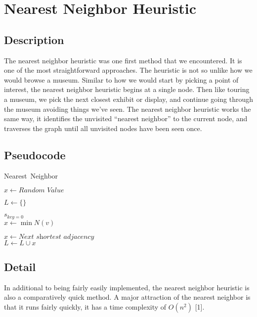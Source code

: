 \documentclass{article}
\begin{document}
\section{Nearest Neighbor Heuristic}

\subsection{Description}

The nearest neighbor heuristic was one first method that we encountered. It is
one of the most straightforward approaches. The heuristic is not so unlike how
we would browse a museum. Similar to how we would start by picking a point of
interest, the nearest neighbor heuristic begins at a single node. Then like
touring a museum, we pick the next closest exhibit or display, and continue
going through the museum avoiding things we’ve seen. The nearest neighbor
heuristic works the same way, it identifies the unvisited “nearest neighbor” to
the current node, and traverses the graph until all unvisited nodes have been
seen once.

\subsection{Pseudocode}

\begin{algorithm}
  \caption{Nearest\ Neighbor}
  \label{alg1}
  \begin{algorithmic}[1]

    \State $x \gets \textit{Random\ Value}$

    \State $L \gets \{\}$

    \State $s_{\textit{key} = 0}$
    \\
        \State $x \gets \min N(v)$

        \Else
          \State $x \gets \textit{Next shortest adjacency}$
        \EndIf
      \EndFor
    \EndWhile
    \\
    \State $L \gets L \cup {x}$
    \EndProcedure
  \end{algorithmic}
\end{algorithm}

\subsection{Detail}
In additional to being fairly easily implemented, the nearest neighbor heuristic
is also a comparatively quick method. A major attraction of the nearest neighbor
is that it runs fairly quickly, it has a time complexity of $O(n^2)$ [1].\\
\end{document}
